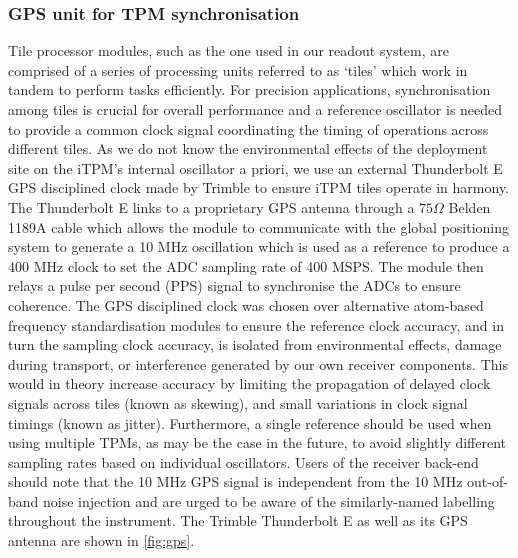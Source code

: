 \subsubsection{GPS unit for TPM synchronisation}
Tile processor modules, such as the one used in our readout system, are comprised of a series of processing units referred to as ‘tiles’ which work in tandem to perform tasks efficiently. For precision applications, synchronisation among tiles is crucial for overall performance and a reference oscillator is needed to provide a common clock signal coordinating the timing of operations across different tiles. As we do not know the environmental effects of the deployment site on the iTPM’s internal oscillator a priori, we use an external Thunderbolt E GPS disciplined clock made by Trimble to ensure iTPM tiles operate in harmony. The Thunderbolt E links to a proprietary GPS antenna through a $75 \Omega$ Belden 1189A cable which allows the module to communicate with the global positioning system to generate a 10 MHz oscillation which is used as a reference to produce a 400 MHz clock to set the ADC sampling rate of 400 MSPS. The module then relays a pulse per second (PPS) signal to synchronise the ADCs to ensure coherence. The GPS disciplined clock was chosen over alternative atom-based frequency standardisation modules to ensure the reference clock accuracy, and in turn the sampling clock accuracy, is isolated from environmental effects, damage during transport, or interference generated by our own receiver components. This would in theory increase accuracy by limiting the propagation of delayed clock signals across tiles (known as skewing), and small variations in clock signal timings (known as jitter). Furthermore, a single reference should be used when using multiple TPMs, as may be the case in the future, to avoid slightly different sampling rates based on individual oscillators. Users of the receiver back-end should note that the 10 MHz GPS signal is independent from the 10 MHz out-of-band noise injection and are urged to be aware of the similarly-named labelling throughout the instrument. The Trimble Thunderbolt E as well as its GPS antenna are shown in \cref{fig:gps}.
